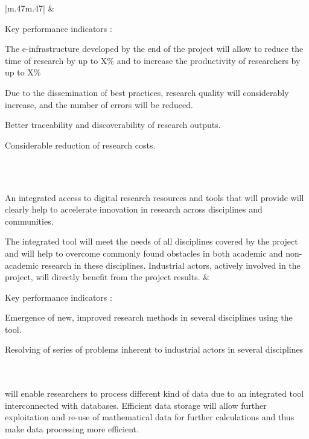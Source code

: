 \begin{supertabular}{|m{.47\textwidth}m{.47\textwidth}|}
 &

  Key performance indicators :
  \begin{compactenum}
\item The e-infrastructure developed by the end of the project will allow to reduce
the time of research by up to X\% and to increase the productivity of researchers by 
up to X\%
\item Due to the dissemination of best practices, research quality will considerably 
increase, and the number of errors will be reduced.
\item Better traceability and discoverability of research outputs.
\item Considerable reduction of research costs.
\end{compactenum}
\\\hline
\hline{}\\\hline

An integrated access to digital research
resources and tools that \TheProject will provide will clearly help to
accelerate innovation in research across disciplines and communities.

The integrated tool will meet the needs of all disciplines covered by
the project and will help to overcome commonly found obstacles in
both academic and non-academic research in these disciplines. Industrial
actors, actively involved in the project, will directly benefit from
the project results. &

Key performance indicators :

\begin{compactenum}
\item Emergence of new, improved research methods in several disciplines using the tool.
\item Resolving of series of problems inherent to industrial actors in several disciplines
\end{compactenum}
\\\hline
\hline{}\\\hline
\TheProject will enable researchers to process
different kind of  data due to an integrated tool interconnected
with databases. Efficient data storage will allow further exploitation
and  re-use of mathematical data for further calculations and thus make
data processing more efficient.


\end{supertabular}

